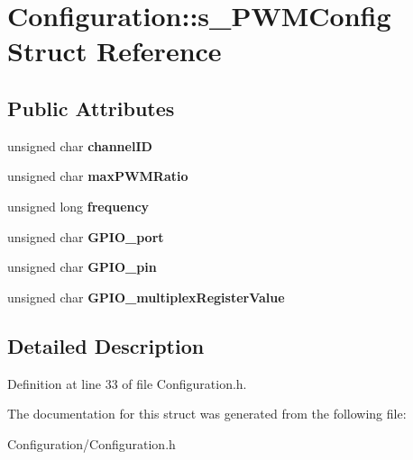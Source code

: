 \section{Configuration\+:\+:s\+\_\+\+P\+W\+M\+Config Struct Reference}
\label{struct_configuration_1_1s___p_w_m_config}
\subsection*{Public Attributes}
\begin{DoxyCompactItemize}
\item 
unsigned char {\bfseries channel\+I\+D}\label{struct_configuration_1_1s___p_w_m_config_a0a89f389fe66362b6a7ed9393192ce76}

\item 
unsigned char {\bfseries max\+P\+W\+M\+Ratio}\label{struct_configuration_1_1s___p_w_m_config_af5f634f23fd0c655106893c642bb9a54}

\item 
unsigned long {\bfseries frequency}\label{struct_configuration_1_1s___p_w_m_config_acd76a816344df59ef089119bec8761f4}

\item 
unsigned char {\bfseries G\+P\+I\+O\+\_\+port}\label{struct_configuration_1_1s___p_w_m_config_ac545a6ff733cfba72694d797da72403a}

\item 
unsigned char {\bfseries G\+P\+I\+O\+\_\+pin}\label{struct_configuration_1_1s___p_w_m_config_a0df63ac5dfc87818825d4bd835e25b88}

\item 
unsigned char {\bfseries G\+P\+I\+O\+\_\+multiplex\+Register\+Value}\label{struct_configuration_1_1s___p_w_m_config_a9d6105e43f30ccc22481a85e49f9874a}

\end{DoxyCompactItemize}


\subsection{Detailed Description}


Definition at line 33 of file Configuration.\+h.



The documentation for this struct was generated from the following file\+:\begin{DoxyCompactItemize}
\item 
Configuration/Configuration.\+h\end{DoxyCompactItemize}
